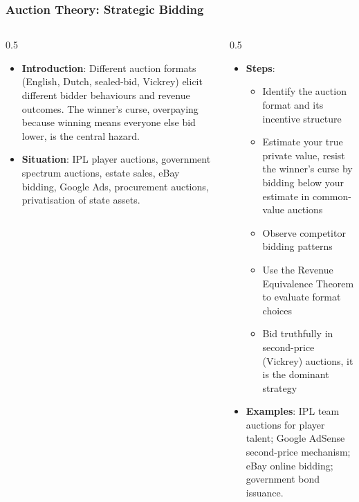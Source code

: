 \begin{frame}[fragile]\frametitle{Auction Theory: Strategic Bidding}
\begin{columns}
    \begin{column}[T]{0.5\linewidth}
      \begin{itemize}
        \item \textbf{Introduction}: Different auction formats (English, Dutch, sealed-bid, Vickrey) elicit different bidder behaviours and revenue outcomes. The winner's curse, overpaying because winning means everyone else bid lower, is the central hazard.
        \item \textbf{Situation}: IPL player auctions, government spectrum auctions, estate sales, eBay bidding, Google Ads, procurement auctions, privatisation of state assets.
      \end{itemize}
    \end{column}
    \begin{column}[T]{0.5\linewidth}
      \begin{itemize}
        \item \textbf{Steps}:
        \begin{itemize}
          \item Identify the auction format and its incentive structure
          \item Estimate your true private value, resist the winner's curse by bidding below your estimate in common-value auctions
          \item Observe competitor bidding patterns
          \item Use the Revenue Equivalence Theorem to evaluate format choices
          \item Bid truthfully in second-price (Vickrey) auctions, it is the dominant strategy
        \end{itemize}\item \textbf{Examples}: IPL team auctions for player talent; Google AdSense second-price mechanism; eBay online bidding; government bond issuance.
      \end{itemize}
    \end{column}
  \end{columns}
\end{frame}

